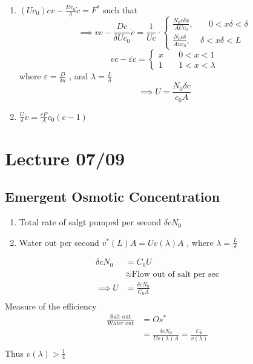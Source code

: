 \documentclass{article}
\theoremstyle{remark}
\begin{document}
\begin{enumerate}
  \item $\left( Uc_{0} \right) cv - \frac{D c_{0}}{ \delta }  \dot{c} = F^{*}$ such that \[
  \implies  vc - \frac{Dc}{ \delta U c_{0}} \dot{c}  =  \frac{1}{Uc}  \cdot \begin{cases}
    \frac{N_{0} c \delta  x}{ AUc_{0} }  ,  &  \quad  0 < x \delta  < \delta \\
    \frac{N_{0} c \delta  }{Auc_{0}}  ,  &  \delta  < x\delta  < L 
  \end{cases}
  \] 
  \[
  vc - \varepsilon  \dot{c} = \begin{cases}
    x \quad   &  0 < x < 1 \\
    1 \quad   &  1 < x < \lambda   
  \end{cases}
  \] 
  where $\varepsilon  = \frac{D}{ \delta u} $ , and $\lambda  = \frac{L }{ \delta } $ \[
  \implies  U = \frac{N_{0} \delta  c}{ c_{0} A} 
  \] 
\item $\frac{U}{\delta } \dot{v}  = \frac{cP }{A}  c_{0}\left( c-1 \right)$ \[
\] 


\end{enumerate}



\newpage
\section{Lecture 07/09}%
\label{sec:lecture_07_09}

\subsection{Emergent Osmotic Concentration}%
\label{sub:emergent_osmotic_concentration}

\begin{enumerate}[label=(\roman*)]
  \item Total rate of salgt pumped per second $\delta  c  N_{0}$
  \item Water out per second  $v^{*} \left( L \right) A = U v\left( \lambda  \right) A $ , where $ \lambda  = \frac{L}{\delta } $
\end{enumerate}

\[
  \begin{split}
  \delta c N_{0}  & = C_{0} U \\
    &  \approx \text{Flow out of salt per sec} \\
    \implies  U &=  \frac{\delta c N_{0}}{ C_{0 } A}  \\
  \end{split} 
\] 
Measure of the efficiency \[
  \begin{split}
\frac{\text{Salt out}}{ \text{Water out}}   & = O s ^{*}\\
&= \frac{\delta  c N_{0}}{ U v\left( \lambda  \right) A}  = \frac{C_{0}}{ v\left( \lambda  \right)}  \\
  \end{split} 
\] 
Thus $v\left( \lambda  \right) > \frac{1}{4}$
\end{document}
